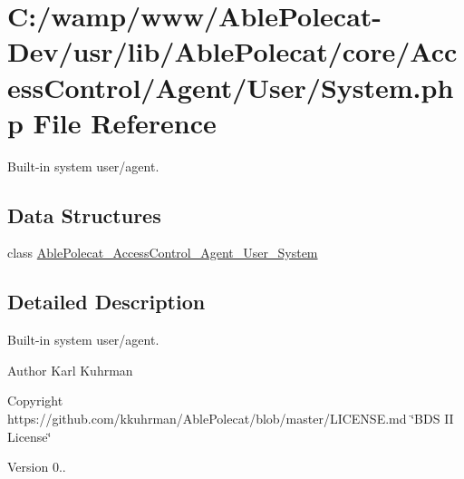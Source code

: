 \hypertarget{_system_8php}{}\section{C\+:/wamp/www/\+Able\+Polecat-\/\+Dev/usr/lib/\+Able\+Polecat/core/\+Access\+Control/\+Agent/\+User/\+System.php File Reference}
\label{_system_8php}


Built-\/in system user/agent.  


\subsection*{Data Structures}
\begin{DoxyCompactItemize}
\item 
class \hyperlink{class_able_polecat___access_control___agent___user___system}{Able\+Polecat\+\_\+\+Access\+Control\+\_\+\+Agent\+\_\+\+User\+\_\+\+System}
\end{DoxyCompactItemize}


\subsection{Detailed Description}
Built-\/in system user/agent. 

\begin{DoxyAuthor}{Author}
Karl Kuhrman 
\end{DoxyAuthor}
\begin{DoxyCopyright}{Copyright}
https\+://github.com/kkuhrman/\+Able\+Polecat/blob/master/\+L\+I\+C\+E\+N\+S\+E.\+md \char`\"{}\+B\+D\+S I\+I License\char`\"{} 
\end{DoxyCopyright}
\begin{DoxyVersion}{Version}
0.. 
\end{DoxyVersion}
